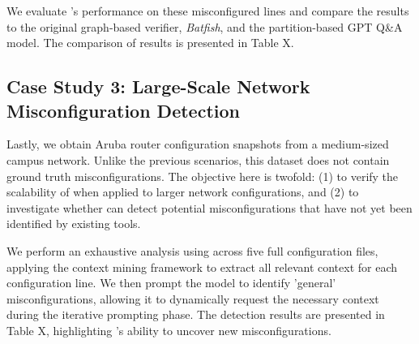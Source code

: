 We evaluate \sysname{}'s performance on these misconfigured lines and compare the results to the original graph-based verifier, \textit{Batfish}, and the partition-based GPT Q\&A model. The comparison of results is presented in Table X.

\subsection{Case Study 3: Large-Scale Network Misconfiguration Detection}
Lastly, we obtain Aruba router configuration snapshots from a medium-sized campus network. Unlike the previous scenarios, this dataset does not contain ground truth misconfigurations. The objective here is twofold: (1) to verify the scalability of \sysname{} when applied to larger network configurations, and (2) to investigate whether \sysname{} can detect potential misconfigurations that have not yet been identified by existing tools.

We perform an exhaustive analysis using \sysname{} across five full configuration files, applying the context mining framework to extract all relevant context for each configuration line. We then prompt the model to identify 'general' misconfigurations, allowing it to dynamically request the necessary context during the iterative prompting phase. The detection results are presented in Table X, highlighting \sysname{}'s ability to uncover new misconfigurations.
